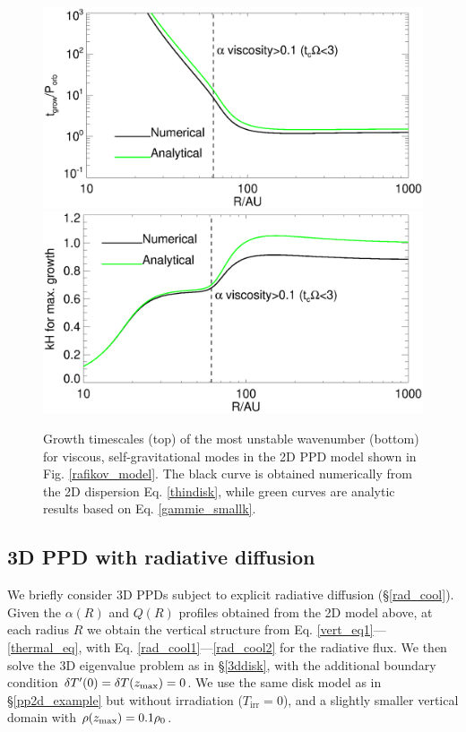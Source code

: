 \begin{figure}
  \includegraphics[width=\linewidth,clip=true,trim=0cm 1.5cm 0cm
    0.0cm]{figures/ppd_2d_growth}\\
  \includegraphics[width=\linewidth,clip=true,trim=0cm 0cm 0cm
    0.8cm]{figures/ppd_2d_maxk}
  \caption{Growth timescales (top) of the most unstable
    wavenumber (bottom) for viscous,
    self-gravitational modes in the 2D PPD model shown in
    Fig. \ref{rafikov_model}. 
    The black curve is obtained numerically
    from the 2D dispersion Eq. \ref{thindisk}, while green curves 
    are analytic results based on Eq. \ref{gammie_smallk}. 
    \label{rafikov_growth}}
\end{figure}


\subsection{3D PPD with radiative diffusion}
We briefly consider 3D PPDs subject to explicit radiative diffusion 
(\S\ref{rad_cool}). Given the $\alpha(R)$ and $Q(R)$ profiles obtained
from the 2D model above, at each radius $R$ we obtain the vertical
structure from Eq. \ref{vert_eq1}---\ref{thermal_eq}, with 
Eq. \ref{rad_cool1}---\ref{rad_cool2} for the radiative flux.
We then solve the 3D eigenvalue problem as in \S\ref{3ddisk}, with the
additional boundary condition $\delta T^\prime(0) = \delta T(z_\mathrm{max}) = 0$.    
We use the same disk model as in \S\ref{pp2d_example} but without 
irradiation ($T_\mathrm{irr}=0$), and a slightly smaller vertical
domain with $\rho(z_\mathrm{max})=0.1\rho_0$.  %

